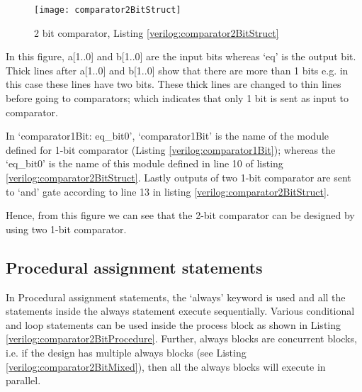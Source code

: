 
\begin{figure}
	\centering
	\texttt{[image: comparator2BitStruct]}
	\caption{2 bit comparator, Listing \ref{verilog:comparator2BitStruct}}
	\label{fig:comparator2BitStruct}
\end{figure}

\begin{explanation}
	In this figure, a[1..0] and b[1..0]  are the input bits  whereas `eq' is the output bit. Thick lines after a[1..0] and b[1..0] show that there are more than 1 bits e.g. in this case these lines have two bits. These thick lines are changed to thin lines before going to comparators; which indicates that only 1 bit is sent as input to comparator. 
	
	In `comparator1Bit: eq\_bit0', `comparator1Bit' is the name of the module defined for 1-bit comparator (Listing \ref{verilog:comparator1Bit}); whereas the `eq\_bit0' is the name of this module defined in line 10 of listing \ref{verilog:comparator2BitStruct}. Lastly outputs of two 1-bit comparator are sent to `and' gate according to line 13 in listing \ref{verilog:comparator2BitStruct}. 
	
	Hence, from this figure we can see that the 2-bit comparator can be designed by using two 1-bit comparator. 
\end{explanation}

\subsection{Procedural assignment statements}\label{sec:proceduralModeling}
In Procedural assignment statements, the `always' keyword is used and all the statements inside the always statement execute sequentially. Various conditional and loop statements can be used inside the process block as shown in Listing \ref{verilog:comparator2BitProcedure}. Further, always blocks are concurrent blocks, i.e. if the design has multiple always blocks (see Listing \ref{verilog:comparator2BitMixed}), then all the always blocks will execute in parallel. 

